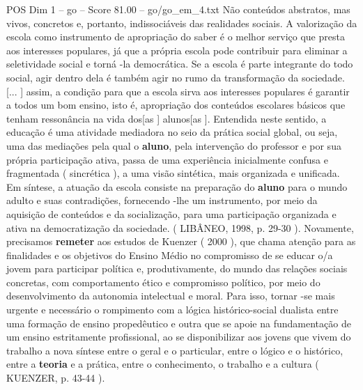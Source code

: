 \begin{textsample}{POS Dim 1 – go – Score 81.00 – go/go\_em\_4.txt}
Não conteúdos abstratos, mas vivos, concretos e, portanto, indissociáveis das realidades sociais.
A valorização da escola como instrumento de apropriação do saber é o melhor serviço que presta aos interesses populares, já que a própria escola pode contribuir para eliminar a seletividade social e torná -la democrática.
Se a escola é parte integrante do todo social, agir dentro dela é também agir no rumo da transformação da sociedade. [... ] assim, a condição para que a escola sirva aos interesses populares é garantir a todos um bom ensino, isto é, apropriação dos conteúdos escolares básicos que tenham ressonância na vida dos[as ] alunos[as ].
Entendida neste sentido, a educação é uma atividade mediadora no seio da prática social global, ou seja, uma das mediações pela qual o \textbf{aluno}, pela intervenção do professor e por sua própria participação ativa, passa de uma experiência inicialmente confusa e fragmentada ( sincrética ), a uma visão sintética, mais organizada e unificada.
Em síntese, a atuação da escola consiste na preparação do \textbf{aluno} para o mundo adulto e suas contradições, fornecendo -lhe um instrumento, por meio da aquisição de conteúdos e da socialização, para uma participação organizada e ativa na democratização da sociedade. ( LIBÂNEO, 1998, p. 29-30 ).
Novamente, precisamos \textbf{remeter} aos estudos de Kuenzer ( 2000 ), que chama atenção para as finalidades e os objetivos do Ensino Médio no compromisso de se educar o/a jovem para participar política e, produtivamente, do mundo das relações sociais concretas, com comportamento ético e compromisso político, por meio do desenvolvimento da autonomia intelectual e moral.
Para isso, tornar -se mais urgente e necessário o rompimento com a lógica histórico-social dualista entre uma formação de ensino propedêutico e outra que se apoie na fundamentação de um ensino estritamente profissional, ao se disponibilizar aos jovens que vivem do trabalho a nova síntese entre o geral e o particular, entre o lógico e o histórico, entre a \textbf{teoria} e a prática, entre o conhecimento, o trabalho e a cultura ( KUENZER, p. 43-44 ).

\end{textsample}
